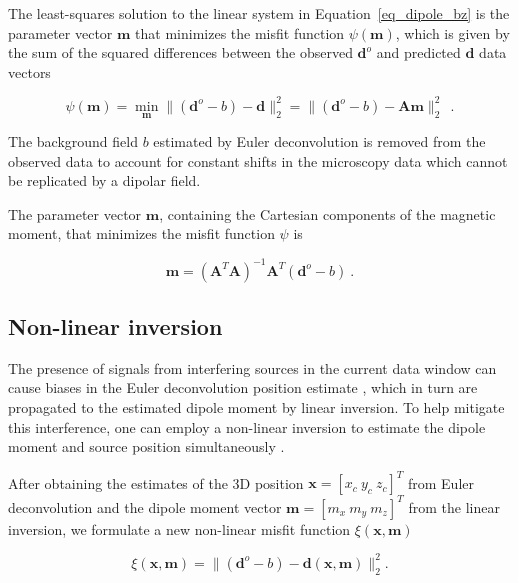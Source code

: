     The least-squares solution to the linear system in  Equation~\ref{eq_dipole_bz} is the parameter vector $\mathbf{m}$ that minimizes the misfit function $\psi(\mathbf{m})$, which is given by the sum of the squared differences between the observed  $\mathbf{d}^o$ and predicted $\mathbf{d}$ data vectors
   
    \begin{equation}
    \label{psi_function}
    \psi(\mathbf{m}) 
    = \min_{\mathbf{m}} \| (\mathbf{d}^o - b) - \mathbf{d} \|_2^2
    = \| (\mathbf{d}^o - b) - \mathbf{A}\mathbf{m} \|_2^2\ 
    \ .
    \end{equation}

    \noindent
    The background field $b$ estimated by Euler deconvolution is removed from the observed data to account for constant shifts in the microscopy data which cannot be replicated by a dipolar field.
    
    The parameter vector $\mathbf{m}$, containing the Cartesian components of the magnetic moment, that minimizes the misfit function $\psi$ is

    \begin{equation}
    \label{dipole_moment_solution}
    \mathbf{m} = \left(\mathbf{A}^T \mathbf{A}\right)^{-1} \mathbf{A}^T (\mathbf{d}^o - b)\ .
    \end{equation}

        
\subsection{Non-linear inversion} 

    The presence of signals from interfering sources in the current data window can cause biases in the Euler deconvolution position estimate \citep{Uieda2025}, which in turn are propagated to the estimated dipole moment by linear inversion. 
    To help mitigate this interference, one can employ a non-linear inversion to estimate the dipole moment and source position simultaneously \citep[\textit{e.g.}][]{Lima2016}. 
    
     After obtaining the estimates of the 3D position $\mathbf{x} = [x_{c}\ y_{c}\ z_{c}]^T$ from Euler deconvolution and the dipole moment vector $\mathbf{m} = [m_{x}\ m_{y}\ m_{z}]^T$ from the linear inversion, we formulate a new non-linear misfit function $\xi(\mathbf{x}, \mathbf{m})$ 
     
    \begin{equation}
    \label{misfit_equation}
    \xi(\mathbf{x}, \mathbf{m}) = 
    \| (\mathbf{d}^o - b) - \mathbf{d}(\mathbf{x}, \mathbf{m}) \|_2^2.
    \end{equation} 

